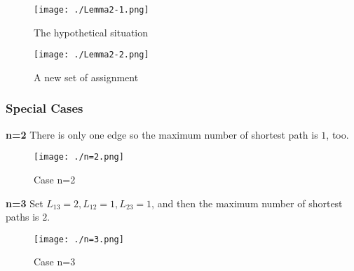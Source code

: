 \documentclass{elegantpaper}
\begin{document}
\begin{figure}[htbp]
	
	\centering
	
	\texttt{[image: ./Lemma2-1.png]}
	
	\caption{The hypothetical situation}
	
\end{figure}
\newpage
\begin{figure}[htbp]
	
	\centering
	
	\texttt{[image: ./Lemma2-2.png]}
	
	\caption{A new set of assignment}
	
\end{figure}

\subsubsection {Special Cases}
\textbf{n=2}	\quad There is only one edge so the maximum number of shortest path is $1$, too.
\begin{figure}[htbp]
	
	\centering
	
	\texttt{[image: ./n=2.png]}
	
	\caption{Case n=2}
	
\end{figure}

\textbf{n=3}	\quad Set $L_{13} = 2, L_{12} = 1, L_{23} = 1$, and then the maximum number of shortest paths is $2$.
\begin{figure}[htbp]
	
	\centering
	
	\texttt{[image: ./n=3.png]}
	
	\caption{Case n=3}
	
\end{figure}
 
\end{document}
